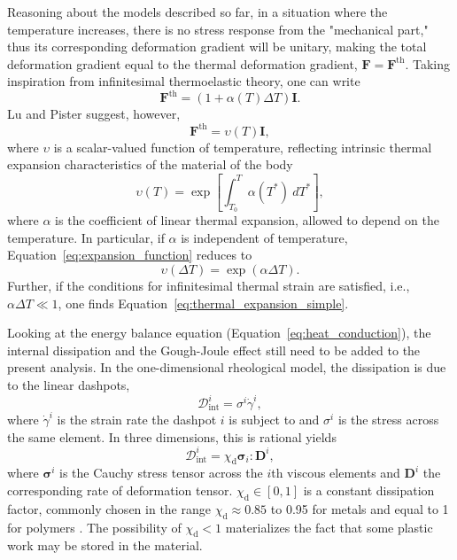 Reasoning about the models described so far, in a situation where the temperature increases, there is no stress response from the "mechanical part," thus its corresponding deformation gradient will be unitary, making the total deformation gradient equal to the thermal deformation gradient, $\bm F = \bm F^\text{th}$.
Taking inspiration from infinitesimal thermoelastic theory, one can write
\begin{equation}
	\label{eq:thermal_expansion_simple}
	\bm F^\text{th} = (1 + \alpha(T)\Delta T)\bm I.
\end{equation}
Lu and Pister \citep{luDecompositionDeformationRepresentation1975} suggest, however,
\begin{equation}
	\bm F^\text{th} = \upsilon(T)\bm I,
\end{equation}
where $\upsilon$ is a scalar-valued function of temperature, reflecting intrinsic thermal expansion characteristics of the material of the body
\begin{equation}
	\label{eq:expansion_function}
	\upsilon(T) = \exp\left[\int_{T_0}^T \alpha(T^*)\ dT^*\right],
\end{equation}
where $\alpha$ is the coefficient of linear thermal expansion, allowed to depend on the temperature.
In particular, if $\alpha$ is independent of temperature, Equation~\ref{eq:expansion_function} reduces to
\begin{equation}
	\upsilon(\Delta T) = \exp(\alpha \Delta T).
\end{equation}
Further, if the conditions for infinitesimal thermal strain are satisfied, i.e., $\alpha\Delta T \ll 1$, one finds Equation~\eqref{eq:thermal_expansion_simple}.

Looking at the energy balance equation (Equation~\eqref{eq:heat_conduction}), the internal dissipation and the Gough-Joule effect still need to be added to the present analysis.
In the one-dimensional rheological model, the dissipation is due to the linear dashpots,
\begin{equation}
	\mathcal D^i_\text{int} = \sigma^i {\dot\gamma}^i,
\end{equation}
where ${\dot \gamma}^i$ is the strain rate the dashpot $i$ is subject to and $\sigma^i$ is the stress across the same element.
In three dimensions, this is rational yields
\begin{equation}
	\mathcal D_\text{int}^i = \chi_\text{d}\bm \sigma_i : \bm D^i,
\end{equation}
where $\bm \sigma^i$ is the Cauchy stress tensor across the $i$th viscous elements and $\bm D^i$ the corresponding rate of deformation tensor.
$\chi_\text{d}\in [0, 1]$ is a constant dissipation factor, commonly chosen in the range $\chi_\text{d}\approx 0.85$ to 0.95 for metals \citep{simoAssociativeCoupledThermoplasticity1992} and equal to 1 for polymers \citep{okerekeTwoprocessConstitutiveModel2019, haoRatedependentConstitutiveModel2022}.
The possibility of $\chi_\text{d}<1$ materializes the fact that some plastic work may be stored in the material.

